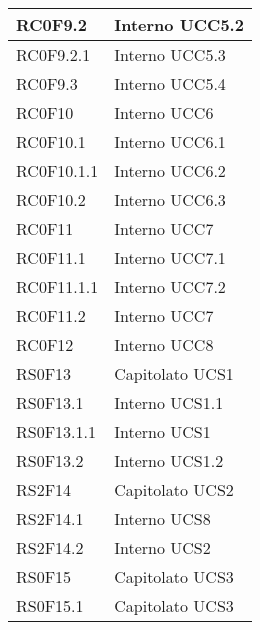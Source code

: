 \begin{center}
\begin{longtable}{|p{5cm}|p{5cm}|}
RC0F9.2		& Interno \newline UCC5.2 \\\hline
RC0F9.2.1	& Interno \newline UCC5.3 \\\hline
RC0F9.3		& Interno \newline UCC5.4 \\\hline
RC0F10		& Interno \newline UCC6 \\\hline
RC0F10.1		& Interno \newline UCC6.1 \\\hline
RC0F10.1.1	& Interno \newline UCC6.2 \\\hline
RC0F10.2		& Interno \newline UCC6.3 \\\hline
RC0F11		& Interno \newline UCC7 \\\hline
RC0F11.1		& Interno \newline UCC7.1 \\\hline
RC0F11.1.1	& Interno \newline UCC7.2 \\\hline
RC0F11.2		& Interno \newline UCC7 \\\hline
RC0F12		& Interno \newline UCC8 \\\hline
RS0F13		& Capitolato \newline UCS1 \\\hline
RS0F13.1		& Interno \newline UCS1.1 \\\hline
RS0F13.1.1	& Interno \newline UCS1 \\\hline
RS0F13.2		& Interno \newline UCS1.2 \\\hline
RS2F14		& Capitolato \newline UCS2 \\\hline
RS2F14.1		& Interno \newline UCS8 \\\hline
RS2F14.2		& Interno \newline UCS2 \\\hline
RS0F15		& Capitolato \newline UCS3 \\\hline
RS0F15.1		& Capitolato \newline UCS3 \\\hline

\end{longtable}
\end{center}
